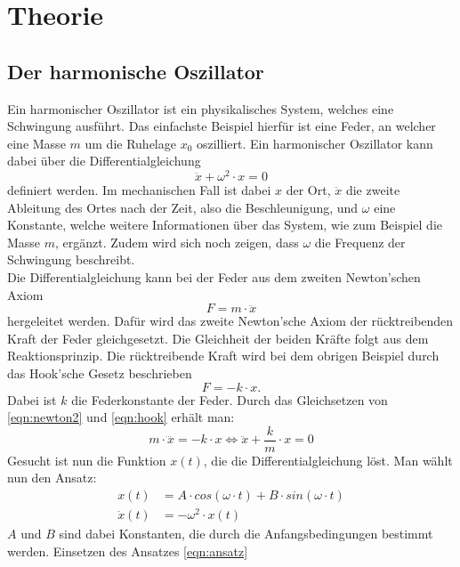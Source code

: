 \section{Theorie}
\label{sec:Theorie}
\subsection{Der harmonische Oszillator}
Ein harmonischer Oszillator ist ein physikalisches System, welches eine Schwingung ausführt. Das einfachste Beispiel
hierfür ist eine Feder, an welcher eine Masse  $m$ um die Ruhelage $x_0$ oszilliert.
Ein harmonischer Oszillator kann dabei über die Differentialgleichung
\begin{equation}
    \ddot{x}+\omega^2\cdot x=0 \label{eqn:harmOsz}
\end{equation}
definiert werden. Im mechanischen Fall ist dabei $x$ der Ort, $\ddot{x}$ die zweite Ableitung des Ortes nach der Zeit,
also die Beschleunigung, und $\omega$ eine Konstante, welche weitere Informationen über das System, wie zum Beispiel die
Masse $m$, ergänzt. Zudem wird sich noch zeigen, dass $\omega$ die Frequenz der Schwingung beschreibt.
\\
Die Differentialgleichung kann bei der Feder aus dem zweiten Newton'schen Axiom
\begin{equation}
    F=m\cdot\ddot{x} \label{eqn:newton2}
\end{equation}
hergeleitet werden. Dafür wird das zweite Newton'sche Axiom der rücktreibenden Kraft der Feder gleichgesetzt. Die
Gleichheit der beiden Kräfte folgt aus dem Reaktionsprinzip. Die rücktreibende Kraft wird bei dem obrigen Beispiel
durch das Hook'sche Gesetz beschrieben
\begin{equation}
    F=-k\cdot x \label{eqn:hook}.
\end{equation}
Dabei ist $k$ die Federkonstante der Feder.
Durch das Gleichsetzen von \eqref{eqn:newton2} und \eqref{eqn:hook} erhält man:
\begin{equation}
    m\cdot\dddot{x}=-k\cdot x \Leftrightarrow \ddot{x}+\frac{k}{m}\cdot x=0 \label{eqn:dgl}
\end{equation}
Gesucht ist nun die Funktion $x(t)$, die die Differentialgleichung löst. Man wählt nun den Ansatz:
\begin{align}
    x(t)&=A\cdot cos(\omega\cdot t)+B\cdot sin(\omega\cdot t) \\
    \ddot{x}(t)&=-\omega^2\cdot x(t)
    \label{eqn:ansatz}
\end{align}
$A$ und $B$ sind dabei Konstanten, die durch die Anfangsbedingungen bestimmt werden. Einsetzen des Ansatzes \eqref{eqn:ansatz}
